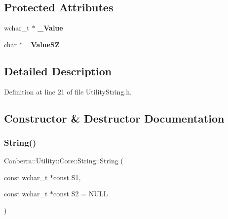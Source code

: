 \subsection*{Protected Attributes}
\begin{DoxyCompactItemize}
\item 
\mbox{\label{class_canberra_1_1_utility_1_1_core_1_1_string_a576eacade510079f6f684b0dd8a9b5c8}} 
wchar\+\_\+t $\ast$ {\bfseries \+\_\+\+Value}
\item 
\mbox{\label{class_canberra_1_1_utility_1_1_core_1_1_string_a86f09207d6d677aec726af924e0cd9a4}} 
char $\ast$ {\bfseries \+\_\+\+Value\+SZ}
\end{DoxyCompactItemize}


\subsection{Detailed Description}


Definition at line 21 of file Utility\+String.\+h.



\subsection{Constructor \& Destructor Documentation}
\mbox{\label{class_canberra_1_1_utility_1_1_core_1_1_string_a00d9926206b104343a1a234b66dd0f9b_a00d9926206b104343a1a234b66dd0f9b}} 
\subsubsection{\texorpdfstring{String()}{String()}\hspace{0.1cm}{\footnotesize\ttfamily [1/6]}}
{\footnotesize\ttfamily Canberra\+::\+Utility\+::\+Core\+::\+String\+::\+String (\begin{DoxyParamCaption}\item[{const wchar\+\_\+t $\ast$const}]{S1,  }\item[{const wchar\+\_\+t $\ast$const}]{S2 = {\ttfamily NULL} }\end{DoxyParamCaption})\hspace{0.3cm}{\ttfamily [explicit]}}

